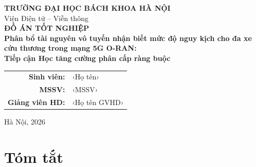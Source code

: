 \documentclass[a4paper,12pt,oneside]{report}
\begin{document}
\begin{titlepage}
\centering
\vspace*{1cm}

{\large \textbf{TRƯỜNG ĐẠI HỌC BÁCH KHOA HÀ NỘI}}\\[0.3cm]
{\large Viện Điện tử -- Viễn thông}\\[2cm]

{\Large \textbf{ĐỒ ÁN TỐT NGHIỆP}}\\[1.5cm]

{\LARGE \textbf{Phân bổ tài nguyên vô tuyến nhận biết mức độ nguy kịch cho đa xe cứu thương trong mạng 5G O-RAN:}}\\[0.5cm]
{\LARGE \textbf{Tiếp cận Học tăng cường phân cấp ràng buộc}}\\[2cm]

\begin{tabular}{r l}
\textbf{Sinh viên:}     & ‹Họ tên›  \\
\textbf{MSSV:}           & ‹MSSV›    \\
\textbf{Giảng viên HD:}  & ‹Họ tên GVHD› \\
\end{tabular}

\vfill
{\large Hà Nội, 2026}
\end{titlepage}


\chapter*{Tóm tắt}


\tableofcontents
\listoffigures
\listoftables
\printglossary[type=\acronymtype,title={Danh mục từ viết tắt}]













\appendix

\end{document}
